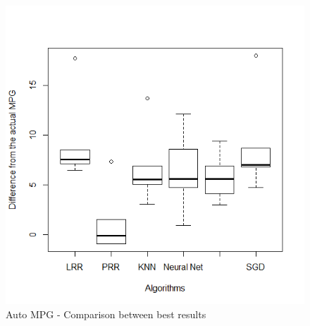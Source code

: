 \begin{figure}
	\center
	\includegraphics[scale=\figurescaling]{figures/mpg_bestresults.png}
	\caption{Auto MPG - Comparison between best results\label{fig:db1-mpg_bestresults}}
\end{figure}
